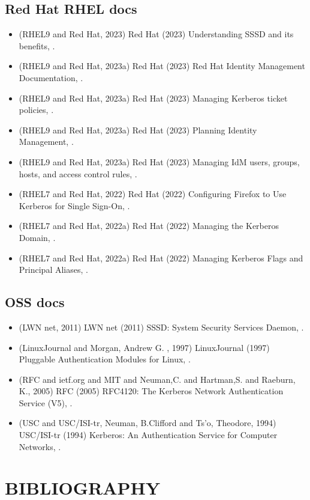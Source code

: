 \documentclass[10pt,a4paper]{article}
\begin{document}
\subsection{Red Hat RHEL docs}
\label{sec:org887336f}
\begin{itemize}
\item (RHEL9 and Red Hat, 2023) Red Hat (2023) Understanding SSSD and its benefits, .
\item (RHEL9 and Red Hat, 2023a) Red Hat (2023) Red Hat Identity Management Documentation, .
\item (RHEL9 and Red Hat, 2023a) Red Hat (2023) Managing Kerberos ticket policies, .
\item (RHEL9 and Red Hat, 2023a) Red Hat (2023) Planning Identity Management, .
\item (RHEL9 and Red Hat, 2023a) Red Hat (2023) Managing IdM users, groups, hosts, and access control rules, .
\item (RHEL7 and Red Hat, 2022) Red Hat (2022) Configuring Firefox to Use Kerberos for Single Sign-On, .
\item (RHEL7 and Red Hat, 2022a) Red Hat (2022) Managing the Kerberos Domain, .
\item (RHEL7 and Red Hat, 2022a) Red Hat (2022) Managing Kerberos Flags and Principal Aliases, .
\end{itemize}

\subsection{OSS docs}
\label{sec:org633976f}
\begin{itemize}
\item (LWN net, 2011) LWN net (2011) SSSD: System Security Services Daemon, .
\item (LinuxJournal and Morgan, Andrew G. , 1997) LinuxJournal (1997) Pluggable Authentication Modules for Linux, .
\item (RFC and ietf.org and MIT and Neuman,C. and Hartman,S. and Raeburn, K., 2005) RFC (2005) RFC4120: The Kerberos Network Authentication Service (V5), .
\item (USC and USC/ISI-tr, Neuman, B.Clifford and Ts'o, Theodore, 1994) USC/ISI-tr (1994) Kerberos: An Authentication Service for Computer Networks, .
\end{itemize}


\newpage

\section{BIBLIOGRAPHY}
\label{sec:org3d4f21e}
\end{document}
